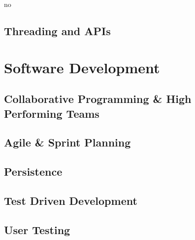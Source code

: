 no\documentclass{article}
\begin{document}
\subsection{Threading and APIs}

\newpage
\section{Software Development}

\subsection{Collaborative Programming \& High Performing Teams}

\subsection{Agile \& Sprint Planning}

\subsection{Persistence}

\subsection{Test Driven Development}

\subsection{User Testing}
\end{document}
